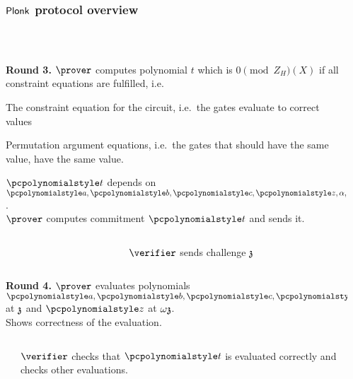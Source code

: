 \documentclass[aspectratio=169,handout]{beamer}
\renewcommand{\myskip}{0.5\baselineskip}
\begin{document}
  \begin{frame}[t]
    \frametitle{$\textnormal{\textsf{Plonk}}$ protocol overview}
    \\[\myskip]
  
  \begin{columns}
    \begin{column}{0.5\linewidth}
      \textbf{Round 3.} $\prover$ computes polynomial $t$ which is $0 \pmod
      Z_H(X)$ if all constraint equations are fulfilled, i.e.~
    \begin{compactitem}
    \item The constraint equation for the circuit, i.e.~the gates evaluate to
      correct values
    \item Permutation argument equations, i.e.~the gates that should have the
      same value, have the same value.
    \end{compactitem}
    $\p{t}$ depends on $\p{a}, \p{b}, \p{c}, \p{z}, \alpha, \beta, \gamma$.\\
    $\prover$ computes commitment $\p{t}$ and sends it.
  \end{column}
  \begin{column}{0.5\linewidth}
  \end{column}
\end{columns}
\begin{columns}
  \begin{column}{0.5\linewidth}
  \end{column}
  \begin{column}{0.5\linewidth}
    $\verifier$ sends challenge $\mathfrak{z}$
  \end{column}
\end{columns}
 \begin{columns}
    \begin{column}{0.5\linewidth}
      \textbf{Round 4.} $\prover$ evaluates polynomials $\p{a}, \p{b}, \p{c},
      \p{t}$ at $\mathfrak{z}$ and $\p{z}$ at $\omega \mathfrak{z}$.\\
      Shows correctness of the evaluation.
    \end{column}
    \begin{column}{0.5\linewidth}
    \end{column}
  \end{columns}
  \begin{columns}
    \begin{column}{0.5\linewidth}
    \end{column}
    \begin{column}{0.5\linewidth}
      $\verifier$ checks that $\p{t}$ is evaluated correctly and checks other
      evaluations.
    \end{column}
  \end{columns}
\end{frame}
\end{document}
